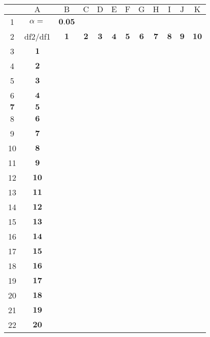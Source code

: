 \documentclass[10pt]{article}
\begin{document}
\begin{CJK*}{UTF8}{bsmi}
\begin{center}
\begin{tabular}{|c|c|c|c|c|c|c|c|c|c|c|c|}
\hline
 & $\mathrm{A}$ & $\mathrm{B}$ & $\mathrm{C}$ & $\mathrm{D}$ & $\mathrm{E}$ & $\mathrm{F}$ & $\mathrm{G}$ & $\mathrm{H}$ & $\mathrm{I}$ & $\mathrm{J}$ & $\mathrm{K}$ \\
\hline
1 & $\alpha=$ & $\mathbf{0 . 0 5}$ &  &  &  &  &  &  &  &  &  \\
\hline
2 & df2/df1 & $\mathbf{1}$ & $\mathbf{2}$ & $\mathbf{3}$ & $\mathbf{4}$ & $\mathbf{5}$ & $\mathbf{6}$ & $\mathbf{7}$ & $\mathbf{8}$ & $\mathbf{9}$ & $\mathbf{1 0}$ \\
\hline
3 & $\mathbf{1}$ &  &  &  &  &  &  &  &  &  &  \\
\hline
4 & $\mathbf{2}$ &  &  &  &  &  &  &  &  &  &  \\
\hline
5 & $\mathbf{3}$ &  &  &  &  &  &  &  &  &  &  \\
\hline
6 & $\mathbf{4}$ &  &  &  &  &  &  &  &  &  &  \\
\hline
$\mathbf{7}$ & $\mathbf{5}$ &  &  &  &  &  &  &  &  &  &  \\
\hline
8 & $\mathbf{6}$ &  &  &  &  &  &  &  &  &  &  \\
\hline
9 & $\mathbf{7}$ &  &  &  &  &  &  &  &  &  &  \\
\hline
10 & $\mathbf{8}$ &  &  &  &  &  &  &  &  &  &  \\
\hline
11 & $\mathbf{9}$ &  &  &  &  &  &  &  &  &  &  \\
\hline
12 & $\mathbf{1 0}$ &  &  &  &  &  &  &  &  &  &  \\
\hline
13 & $\mathbf{1 1}$ &  &  &  &  &  &  &  &  &  &  \\
\hline
14 & $\mathbf{1 2}$ &  &  &  &  &  &  &  &  &  &  \\
\hline
15 & $\mathbf{1 3}$ &  &  &  &  &  &  &  &  &  &  \\
\hline
16 & $\mathbf{1 4}$ &  &  &  &  &  &  &  &  &  &  \\
\hline
17 & $\mathbf{1 5}$ &  &  &  &  &  &  &  &  &  &  \\
\hline
18 & $\mathbf{1 6}$ &  &  &  &  &  &  &  &  &  &  \\
\hline
19 & $\mathbf{1 7}$ &  &  &  &  &  &  &  &  &  &  \\
\hline
20 & $\mathbf{1 8}$ &  &  &  &  &  &  &  &  &  &  \\
\hline
21 & $\mathbf{1 9}$ &  &  &  &  &  &  &  &  &  &  \\
\hline
22 & $\mathbf{2 0}$ &  &  &  &  &  &  &  &  &  &  \\
\hline
\end{tabular}
\end{center}


\end{CJK*}
\end{document}
